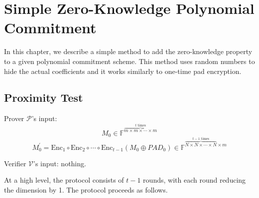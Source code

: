 \chapter{Simple Zero-Knowledge Polynomial Commitment}

In this chapter, we describe a simple method to add the zero-knowledge property to a given polynomial commitment scheme. This method uses random numbers to hide the actual coefficients and it works similarly to one-time pad encryption.

\section{Proximity Test}

Prover $\mathcal{P}$'s input: 
$$
    M_0 \in \mathbb{F}^{\overbrace{m \times m \times \cdots \times m}^{t \text{ times}}}
$$
$$
    M_0^{\prime} = \text{Enc}_1 \circ \text{Enc}_2 \circ \cdots \circ \text{Enc}_{t-1}(M_0 \oplus PAD_0) \in \mathbb{F}^{\overbrace{N \times N \times \cdots \times N}^{t-1 \text{ times}} \times m}
$$

Verifier $\mathcal{V}$'s input: nothing.

At a high level, the protocol consists of $t-1$ rounds, with each round reducing the dimension by 1. The protocol proceeds as follows. 

